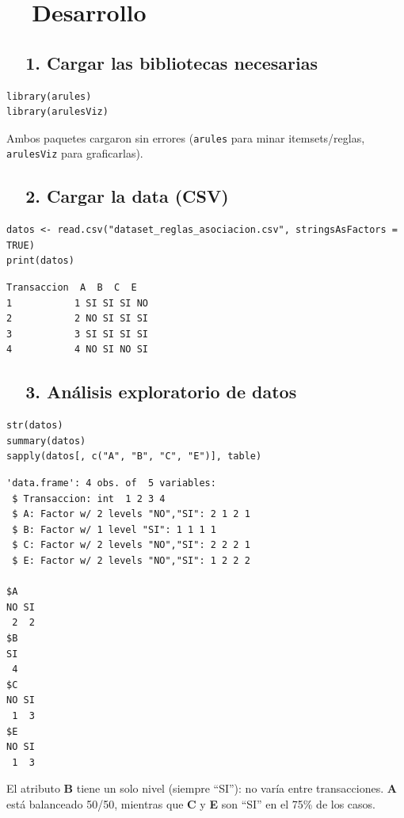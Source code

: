 \documentclass[11pt,a4paper]{article}
\begin{document}
\section{\faCogs\ \ Desarrollo}

\subsection{\faBoxOpen\ \ 1. Cargar las bibliotecas necesarias}
\begin{lstlisting}[style=styleR]
library(arules)
library(arulesViz)
\end{lstlisting}
Ambos paquetes cargaron sin errores (\texttt{arules} para minar itemsets/reglas, \texttt{arulesViz} para graficarlas).

\subsection{\faFileImport\ \ 2. Cargar la data (CSV)}
\begin{lstlisting}[style=styleR]
datos <- read.csv("dataset_reglas_asociacion.csv", stringsAsFactors = TRUE)
print(datos)
\end{lstlisting}
\begin{lstlisting}[style=styleOut]
  Transaccion  A  B  C  E
1           1 SI SI SI NO
2           2 NO SI SI SI
3           3 SI SI SI SI
4           4 NO SI NO SI
\end{lstlisting}

\subsection{\faSearch\ \ 3. Análisis exploratorio de datos}
\begin{lstlisting}[style=styleR]
str(datos)
summary(datos)
sapply(datos[, c("A", "B", "C", "E")], table)
\end{lstlisting}
\begin{lstlisting}[style=styleOut]
'data.frame': 4 obs. of  5 variables:
 $ Transaccion: int  1 2 3 4
 $ A: Factor w/ 2 levels "NO","SI": 2 1 2 1
 $ B: Factor w/ 1 level "SI": 1 1 1 1
 $ C: Factor w/ 2 levels "NO","SI": 2 2 2 1
 $ E: Factor w/ 2 levels "NO","SI": 1 2 2 2

$A
NO SI
 2  2
$B
SI
 4
$C
NO SI
 1  3
$E
NO SI
 1  3
\end{lstlisting}
El atributo \textbf{B} tiene un solo nivel (siempre ``SI''): no varía entre transacciones. \textbf{A} está balanceado 50/50, mientras que \textbf{C} y \textbf{E} son ``SI'' en el 75\% de los casos.
\end{document}
